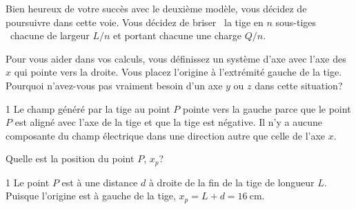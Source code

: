 \documentclass{tufte-handout}
\def\reponse{1}
\begin{document}
Bien heureux de votre succès avec le deuxième modèle, vous décidez de
poursuivre dans cette voie. Vous décidez de \og briser \fg\ la tige en $n$
\og sous-tiges \fg\ chacune de largeur $L/n$ et portant chacune une charge
$Q/n$.
\begin{marginfigure}
\end{marginfigure}
Pour vous aider dans vos calculs, vous définissez un système d'axe avec l'axe
des $x$ qui pointe vers la droite. Vous placez l'origine à l'extrémité gauche
de la tige. Pourquoi n'avez-vous pas vraiment besoin d'un axe $y$ ou $z$ dans
cette situation?

\if\reponse1
  {\color{tblue}
    Le champ généré par la tige au point $P$ pointe vers la gauche parce que le
    point $P$ est aligné avec l'axe de la tige et que la tige est négative. Il
    n'y a aucune composante du champ électrique dans une direction autre que
    celle de l'axe $x$.
  }
\else
  \vspace{1cm}
\fi


Quelle est la position du point $P$, $x_p$?

\if\reponse1
  {\color{tblue}
    Le point $P$ est à une distance $d$ à droite de la fin de la tige de
    longueur $L$. Puisque l'origine est à gauche de la tige, $x_p = L + d =
    \SI{16}{\centi\meter}$.
  }
\else
  \vspace{1cm}
\fi
\end{document}
